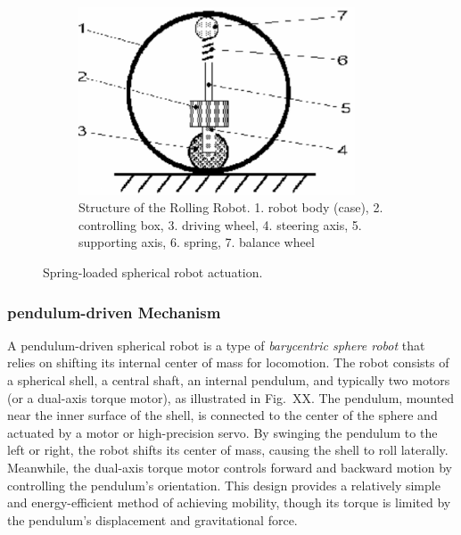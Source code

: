 \documentclass[english, bachelor, utf8]{base/thesis_telematics}
\begin{document}
\begin{figure}[ht]
    \centering
\begin{subfigure}{0.48\textwidth}
    \centering
    \includegraphics[width=0.9\textwidth]{pics/spring_2d.png}
    \caption{Structure of the Rolling Robot. 1. robot body (case), 2. controlling box, 3. driving wheel, 4. steering axis, 5. supporting axis, 6. spring, 7. balance wheel~\cite{old_spring_paper}}
    \label{fig:spring_2D_top}
\end{subfigure}

\caption{Spring-loaded spherical robot actuation.}
\label{fig:spring_sphere}
\end{figure}



\subsubsection{pendulum-driven Mechanism}
A pendulum-driven spherical robot is a type of \textit{barycentric sphere robot} that relies on shifting its internal center of mass for locomotion. 
The robot consists of a spherical shell, a central shaft, an internal pendulum, and typically two motors (or a dual-axis torque motor), as illustrated in Fig.~XX. 
The pendulum, mounted near the inner surface of the shell, is connected to the center of the sphere and actuated by a motor or high-precision servo. 
By swinging the pendulum to the left or right, the robot shifts its center of mass, causing the shell to roll laterally. 
Meanwhile, the dual-axis torque motor controls forward and backward motion by controlling the pendulum’s orientation. 
This design provides a relatively simple and energy-efficient method of achieving mobility, though its torque is limited by the pendulum’s displacement and gravitational force.\cite{pendulum_sphere,Pendulum_Driven_Spherical_Robot,roboball}
\end{document}
